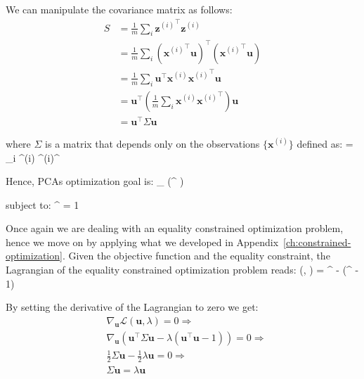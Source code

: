 We can manipulate the covariance matrix as follows:
{\setlength{\jot}{5pt}
\begin{align*}
S & = \frac{1}{m} \sum_{i} {\boldsymbol{z}^{(i)}}^{\intercal} \boldsymbol{z}^{(i)} \\
&= \frac{1}{m} \sum_{i} \left( {\boldsymbol{x}^{(i)}}^{\intercal} \boldsymbol{u} \right)^{\intercal} 
\left({\boldsymbol{x}^{(i)}}^{\intercal} \boldsymbol{u} \right) \\
&= \frac{1}{m} \sum_{i} \boldsymbol{u}^{\intercal} \boldsymbol{x}^{(i)} 
{\boldsymbol{x}^{(i)}}^{\intercal} \boldsymbol{u} \\
&= \boldsymbol{u}^{\intercal} \left( \frac{1}{m} \sum_{i} \boldsymbol{x}^{(i)} 
{\boldsymbol{x}^{(i)}}^{\intercal} \right) \boldsymbol{u} \\
&= \boldsymbol{u}^{\intercal} \Sigma \boldsymbol{u}
\end{align*}}

\vspace{-10pt}

where $\Sigma$ is a matrix that depends only on the observations $\{\boldsymbol{x}^{(i)}\}$ defined as:
\bse
\Sigma =  \sum_{i} ^{(i)} {^{(i)}}^{\intercal}
\ese

Hence, PCAs optimization goal is:
\bse
\max_{} \left(^{\intercal} \Sigma {}\right)
\ese

subject to:
\bse
{}^{\intercal}  = 1
\ese

Once again we are dealing with an equality constrained optimization problem, hence we move on by applying what we 
developed in Appendix~\ref{ch:constrained-optimization}. Given the objective function and the equality constraint, 
the Lagrangian of the equality constrained optimization problem reads:
\bse
{}(, \lambda) = ^{\intercal} \Sigma {} - 
\lambda (^{\intercal}  - 1)
\ese

By setting the derivative of the Lagrangian to zero we get:
{\setlength{\jot}{10pt}
\begin{align*}
& \nabla_{\boldsymbol{u}} \mathcal{L}(\boldsymbol{u}, \lambda) = 0 \Rightarrow \\
& \nabla_{\boldsymbol{u}} \left( \boldsymbol{u}^{\intercal} \Sigma \boldsymbol{u} 
- \lambda (\boldsymbol{u}^{\intercal} \boldsymbol{u} - 1) \right) = 0 \Rightarrow \\
& \frac{1}{2} \Sigma \boldsymbol{u} - \frac{1}{2} \lambda \boldsymbol{u} = 0 \Rightarrow \\
& \Sigma \boldsymbol{u} = \lambda \boldsymbol{u}
\end{align*}}

